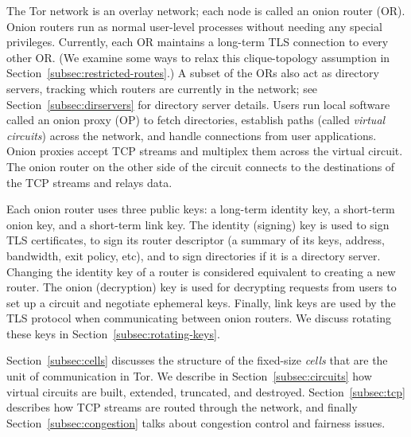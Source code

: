 \documentclass[times,10pt,twocolumn]{article}
\begin{document}
The Tor network is an overlay network; each node is called an onion router
(OR). Onion routers run as normal user-level processes without needing
any special
privileges.  Currently, each OR maintains a long-term TLS \cite{TLS}
connection to every other
OR.  (We examine some ways to relax this clique-topology assumption in
Section~\ref{subsec:restricted-routes}.) A subset of the ORs also act as
directory servers, tracking which routers are currently in the network;
see Section~\ref{subsec:dirservers} for directory server details. Users
run local software called an onion proxy (OP) to fetch directories,
establish paths (called \emph{virtual circuits}) across the network,
and handle connections from user applications. Onion proxies accept
TCP streams and multiplex them across the virtual circuit. The onion
router on the other side 
of the circuit connects to the destinations of
the TCP streams and relays data.

Each onion router uses three public keys: a long-term identity key, a
short-term onion key, and a short-term link key.  The identity
(signing) key is used to sign TLS certificates, to sign its router
descriptor (a summary of its keys, address, bandwidth, exit policy,
etc), and to sign directories if it is a directory server. Changing
the identity key of a router is considered equivalent to creating a
new router. The onion (decryption) key is used for decrypting requests
from users to set up a circuit and negotiate ephemeral keys. Finally,
link keys are used by the TLS protocol when communicating between
onion routers.  We discuss rotating these keys in
Section~\ref{subsec:rotating-keys}.

Section~\ref{subsec:cells} discusses the structure of the fixed-size
\emph{cells} that are the unit of communication in Tor. We describe
in Section~\ref{subsec:circuits} how virtual circuits are
built, extended, truncated, and destroyed. Section~\ref{subsec:tcp}
describes how TCP streams are routed through the network, and finally
Section~\ref{subsec:congestion} talks about congestion control and
fairness issues.

\label{subsec:cells}

\end{document}
